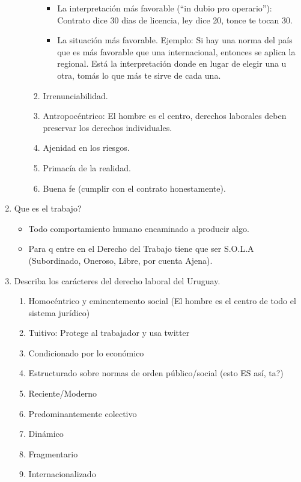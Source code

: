 \documentclass[spanish,12pt,a4paper,titlepage]{report}
\begin{document}
\begin{enumerate}
\begin{itemize}
\begin{enumerate}
\begin{itemize}
      \item La interpretación más favorable (``in dubio pro operario''): Contrato dice 30 dias de licencia, ley dice 20, tonce te tocan 30.
      \item La situación más favorable. Ejemplo: Si hay una norma del país que es más favorable que una internacional, entonces se aplica la regional. Está la interpretación donde en lugar de elegir una u otra, tomás lo que más te sirve de cada una.
      \end{itemize}
    \item Irrenunciabilidad.
    \item Antropocéntrico: El hombre es el centro, derechos laborales deben preservar los derechos individuales.
    \item Ajenidad en los riesgos.
    \item Primacía de la realidad.
    \item Buena fe (cumplir con el contrato honestamente).
    \end{enumerate}
  \end{itemize}
\item Que es el trabajo?
  \begin{itemize}
  \item Todo comportamiento humano encaminado a producir algo.
  \item Para q entre en el Derecho del Trabajo tiene que ser S.O.L.A (Subordinado, Oneroso, Libre, por cuenta Ajena).
  \end{itemize}
\item Describa los carácteres del derecho laboral del Uruguay.
  \begin{enumerate}
  \item Homocéntrico y eminentemento social (El hombre es el centro de todo el sistema jurídico)
  \item Tuitivo: Protege al trabajador y usa twitter
  \item Condicionado por lo económico
  \item Estructurado sobre normas de orden público/social (esto ES así, ta?)
  \item Reciente/Moderno
  \item Predominantemente colectivo
  \item Dinámico
  \item Fragmentario
  \item Internacionalizado

\end{enumerate}
\end{enumerate}
\end{document}
